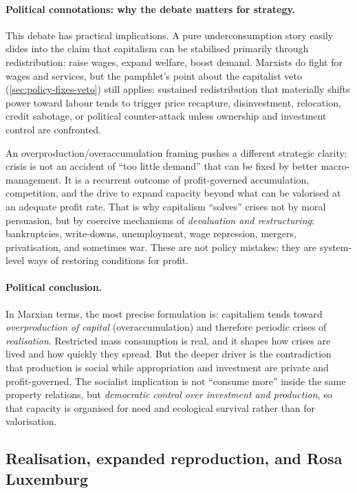 \paragraph{Political connotations: why the debate matters for strategy.}
This debate has practical implications.
A pure underconsumption story easily slides into the claim that capitalism can be stabilised
primarily through redistribution: raise wages, expand welfare, boost demand.
Marxists do fight for wages and services, but the pamphlet’s point about the capitalist veto
(\cref{sec:policy-fixes-veto}) still applies: sustained redistribution that materially shifts power toward labour
tends to trigger price recapture, disinvestment, relocation, credit sabotage, or political
counter-attack unless ownership and investment control are confronted.

An overproduction/overaccumulation framing pushes a different strategic clarity:
crisis is not an accident of “too little demand” that can be fixed by better macro-management.
It is a recurrent outcome of profit-governed accumulation, competition, and the drive to
expand capacity beyond what can be valorised at an adequate profit rate.
That is why capitalism “solves” crises not by moral persuasion, but by coercive mechanisms
of \emph{devaluation and restructuring}: bankruptcies, write-downs, unemployment, wage
repression, mergers, privatisation, and sometimes war.
These are not policy mistakes; they are system-level ways of restoring conditions for profit.

\paragraph{Political conclusion.}
In Marxian terms, the most precise formulation is:
capitalism tends toward \emph{overproduction of capital} (overaccumulation) and therefore
periodic crises of \emph{realisation}.
Restricted mass consumption is real, and it shapes how crises are lived and how quickly
they spread.
But the deeper driver is the contradiction that production is social while appropriation and
investment are private and profit-governed.
The socialist implication is not “consume more” inside the same property relations, but
\emph{democratic control over investment and production}, so that capacity is organised for
need and ecological survival rather than for valorisation.

\subsection{Realisation, expanded reproduction, and Rosa Luxemburg}
\label{sec:rosa-realisation}

